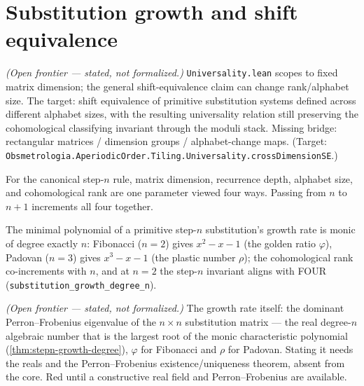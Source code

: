 \section{Substitution growth and shift equivalence}

\begin{theorem}\label{thm:cross-dimension-shift-equivalence}\notready{}
\emph{(Open frontier --- stated, not formalized.)} \texttt{Universality.lean} scopes to fixed matrix
dimension; the general shift-equivalence claim can change rank/alphabet size. The
target: shift equivalence of primitive substitution systems defined across different alphabet sizes,
with the resulting universality relation still preserving the cohomological classifying invariant
through the moduli stack. Missing bridge: rectangular matrices / dimension groups / alphabet-change
maps. (Target: \texttt{Obsmetrologia.AperiodicOrder.Tiling.Universality.crossDimensionSE}.)
\end{theorem}

\begin{theorem}\label{thm:stepn-co-increment}\leanok{}
For the canonical step-$n$ rule, matrix dimension, recurrence depth,
alphabet size, and cohomological rank are one parameter viewed four ways.
Passing from $n$ to $n+1$ increments all four together.
\end{theorem}

\begin{theorem}\label{thm:stepn-growth-degree}\leanok{}
The minimal polynomial of a primitive step-$n$ substitution's growth rate is monic of degree
exactly $n$: Fibonacci ($n=2$) gives $x^2-x-1$ (the golden ratio $\varphi$), Padovan ($n=3$) gives
$x^3-x-1$ (the plastic number $\rho$); the cohomological rank co-increments with $n$, and at $n=2$
the step-$n$ invariant aligns with FOUR (\texttt{substitution\_growth\_degree\_n}).
\end{theorem}

\begin{theorem}\label{thm:stepn-perron-growth}\notready{}
\emph{(Open frontier --- stated, not formalized.)} The growth rate itself: the dominant
Perron--Frobenius eigenvalue of the $n\times n$ substitution matrix --- the real degree-$n$
algebraic number that is the largest root of the monic characteristic polynomial
(\cref{thm:stepn-growth-degree}), $\varphi$ for Fibonacci and $\rho$ for Padovan. Stating it needs
the reals and the Perron--Frobenius existence/uniqueness theorem, absent from the core. Red until a
constructive real field and Perron--Frobenius are available.
\end{theorem}

